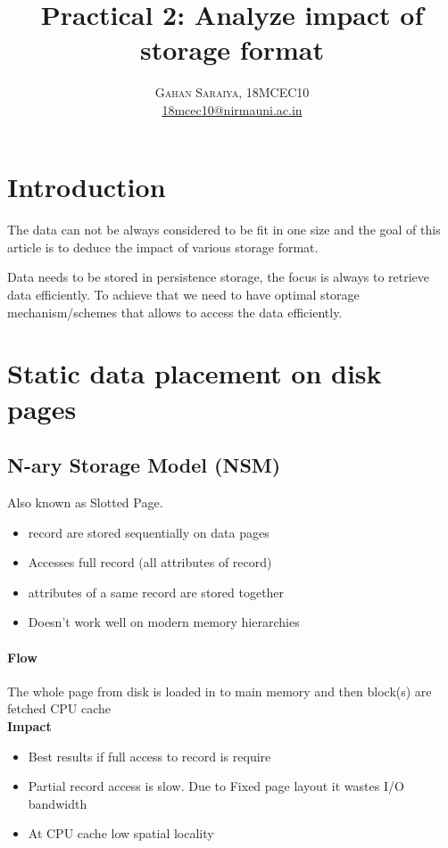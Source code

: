 \documentclass[paper=letter, fontsize=12pt]{article}
\title{\vspace{-15mm}\fontsize{24pt}{10pt}\selectfont\textbf{Practical 2: Analyze impact of storage format}} %
\author{
\large
{\textsc{Gahan Saraiya, 18MCEC10 }}\\[2mm]
\normalsize \href{mailto:18mcec10@nirmauni.ac.in}{18mcec10@nirmauni.ac.in}\\[2mm] %
}
\date{}
\begin{document}
\maketitle %
\thispagestyle{fancy} %

\newcommand*\tick{\item[\Checkmark]}
\newcommand*\arrow{\item[$\Rightarrow$]}
\newcommand*\fail{\item[\XSolidBrush]}

\section{Introduction}
\paragraph{}
The data can not be always considered to be fit in one size and the goal of this article is to deduce the impact of various storage format. 

Data needs to be stored in persistence storage, the focus is always to retrieve data efficiently.
To achieve that we need to have optimal storage mechanism/schemes that allows to access the data efficiently.   


\section{Static data placement on disk pages}
\subsection{N-ary Storage Model (NSM)}
	Also known as Slotted Page.
	\begin{itemize}
		\item record are stored sequentially on data pages
		\item Accesses full record (all attributes of record)
		\tick attributes of a same record are stored together
		\fail Doesn't work well on modern memory hierarchies
	\end{itemize}
	
	\paragraph{Flow}The whole page from disk is loaded in to main memory and then block(s) are fetched CPU cache
	\\
	\textbf{Impact}
	\begin{itemize}
		\tick Best results if full access to record is require
		\fail Partial record access is slow. Due to Fixed page layout it wastes I/O bandwidth
		\fail At CPU cache low spatial locality
	\end{itemize}
\end{document}
